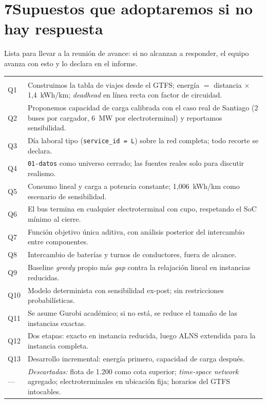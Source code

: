 \documentclass[11pt,a4paper,parskip=half]{scrartcl}
\begin{document}
\section*{7\quad Supuestos que adoptaremos si no hay respuesta}

\begin{nota}
Lista para llevar a la reunión de avance: si no alcanzan a responder, el equipo avanza con esto y lo declara en el informe.
\end{nota}

\begin{longtable}{@{}L{1.4cm}L{13.9cm}@{}}
 &  \\
\endfirsthead
{}
 &  \\
\endhead
\midrule
Q1 & Construimos la tabla de viajes desde el GTFS; energía $=$ distancia $\times$ 1{,}4~kWh/km; \textit{deadhead} en línea recta con factor de circuidad. \\
Q2 & Proponemos capacidad de carga calibrada con el caso real de Santiago (2 buses por cargador, 6~MW por electroterminal) y reportamos sensibilidad. \\
Q3 & Día laboral tipo (\texttt{service\_id = L}) sobre la red completa; todo recorte se declara. \\
Q4 & \texttt{01-datos} como universo cerrado; las fuentes reales solo para discutir realismo. \\
Q5 & Consumo lineal y carga a potencia constante; 1{,}006~kWh/km como escenario de sensibilidad. \\
Q6 & El bus termina en cualquier electroterminal con cupo, respetando el SoC mínimo al cierre. \\
Q7 & Función objetivo única aditiva, con análisis posterior del intercambio entre componentes. \\
Q8 & Intercambio de baterías y turnos de conductores, fuera de alcance. \\
Q9 & Baseline \textit{greedy} propio más \textit{gap} contra la relajación lineal en instancias reducidas. \\
Q10 & Modelo determinista con sensibilidad ex-post; sin restricciones probabilísticas. \\
Q11 & Se asume Gurobi académico; si no está, se reduce el tamaño de las instancias exactas. \\
Q12 & Dos etapas: exacto en instancia reducida, luego ALNS extendida para la instancia completa. \\
Q13 & Desarrollo incremental: energía primero, capacidad de carga después. \\
\midrule
{}
--- & \textit{Descartadas:} flota de 1.200 como cota superior; \textit{time-space network} agregado; electroterminales en ubicación fija; horarios del GTFS intocables. \\
\bottomrule
\end{longtable}

\clearpage
\renewcommand{\refname}{Referencias citadas}

\end{document}

